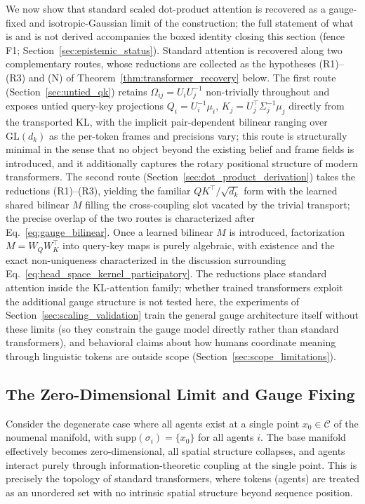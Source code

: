 \documentclass[11pt]{article}
\begin{document}
We now show that standard scaled dot-product attention is recovered as a gauge-fixed and isotropic-Gaussian limit of the construction; the full statement of what is and is not derived accompanies the boxed identity closing this section (fence F1; Section~\ref{sec:epistemic_status}). Standard attention is recovered along two complementary routes, whose reductions are collected as the hypotheses (R1)--(R3) and (N) of Theorem~\ref{thm:transformer_recovery} below. The first route (Section~\ref{sec:untied_qk}) retains $\Omega_{ij} = U_iU_j^{-1}$ non-trivially throughout and exposes untied query-key projections $Q_i = U_i^{-1}\mu_i$, $K_j = U_j^\top\Sigma_j^{-1}\mu_j$ directly from the transported KL, with the implicit pair-dependent bilinear ranging over $\mathrm{GL}(d_k)$ as the per-token frames and precisions vary; this route is structurally minimal in the sense that no object beyond the existing belief and frame fields is introduced, and it additionally captures the rotary positional structure of modern transformers. The second route (Section~\ref{sec:dot_product_derivation}) takes the reductions (R1)--(R3), yielding the familiar $QK^\top/\sqrt{d_k}$ form with the learned shared bilinear $M$ filling the cross-coupling slot vacated by the trivial transport; the precise overlap of the two routes is characterized after Eq.~\eqref{eq:gauge_bilinear}. Once a learned bilinear $M$ is introduced, factorization $M = W_QW_K^\top$ into query-key maps is purely algebraic, with existence and the exact non-uniqueness characterized in the discussion surrounding Eq.~\eqref{eq:head_space_kernel_participatory}. The reductions place standard attention inside the KL-attention family; whether trained transformers exploit the additional gauge structure is not tested here, the experiments of Section~\ref{sec:scaling_validation} train the general gauge architecture itself without these limits (so they constrain the gauge model directly rather than standard transformers), and behavioral claims about how humans coordinate meaning through linguistic tokens are outside scope (Section~\ref{sec:scope_limitations}).

\subsection{The Zero-Dimensional Limit and Gauge Fixing}

Consider the degenerate case where all agents exist at a single point $x_0 \in \mathcal{C}$ of the noumenal manifold, with $\mathrm{supp}(\sigma_i) = \{x_0\}$ for all agents $i$. The base manifold effectively becomes zero-dimensional, all spatial structure collapses, and agents interact purely through information-theoretic coupling at the single point. This is precisely the topology of standard transformers, where tokens (agents) are treated as an unordered set with no intrinsic spatial structure beyond sequence position.
\end{document}
